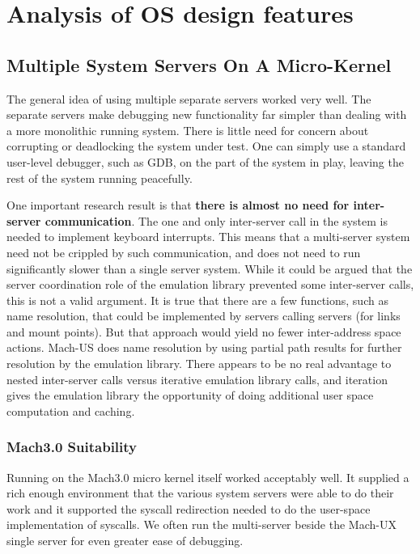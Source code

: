\section{Analysis of OS design features}

\subsection{Multiple System Servers On A Micro-Kernel}
The general idea of using multiple separate servers worked very well.   The
separate servers make debugging new functionality far simpler than
dealing with a more monolithic running system.
There is little need for concern
about corrupting or deadlocking the system under test.
One can simply use a standard user-level debugger, such as GDB, on
the part of the system in play, leaving the rest of the system running
peacefully.

\label{sec:no-interserver}
One important research result
is that {\bf there is almost no need for inter-server
communication}.  
The one and only inter-server call in the system
is needed to implement keyboard interrupts.
This means that a multi-server system need not be crippled by such
communication, and does not need to run significantly slower than a single
server system.
While it could be argued that the server
coordination role of the emulation library prevented some inter-server
calls, this is not a valid argument.  It is true
that there are a few functions, such as name resolution,
that could be implemented by servers
calling servers (for links and mount points).
But that approach would yield no fewer inter-address space
actions.  Mach-US does name resolution by using
partial path results
for further resolution by the emulation library.  There appears to be no
real advantage to nested inter-server calls versus iterative
emulation library calls, and iteration gives
the emulation library the opportunity of doing
additional user space computation and caching.

\subsubsection{Mach3.0 Suitability}
Running on the Mach3.0 micro kernel itself worked acceptably well.
It supplied a rich enough environment that the various system servers were
able to do their work and it supported the syscall redirection needed to
do the user-space implementation of syscalls.  We often run the
multi-server beside the Mach-UX single server for even greater ease of
debugging.

